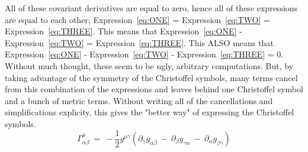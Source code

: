 All of these covariant derivatives are equal to zero, hence all of these expressions are equal to each other;
Expression~\eqref{eq:ONE} = Expression~\eqref{eq:TWO} = Expression~\eqref{eq:THREE}.  This means that
Expression~\eqref{eq:ONE} - Expression~\eqref{eq:TWO} = Expression~\eqref{eq:THREE}.  This ALSO means that
Expression~\eqref{eq:ONE} - Expression~\eqref{eq:TWO} - Expression~\eqref{eq:THREE} = 0.  Without much thought, these
seem to be ugly, arbitrary computations.  But, by taking advantage of the symmetry of the Christoffel symbols, many terms
cancel from this combination of the expressions and leaves behind one Christoffel symbol and a bunch of metric terms.
Without writing all of the cancellations and simplifications explicity, this gives the "better way" of expressing the
Christoffel symbols.
\begin{equation}
  \Gamma^{\mu}_{\alpha\beta}\ =\ -\frac{1}{2}g^{\mu\gamma}
  \left (\partial_{\gamma}g_{\alpha\beta}\ -\ \partial_{\beta}g_{\gamma\alpha}\ -\ \partial_{\alpha}g_{\beta\gamma}\right )
\end{equation}

